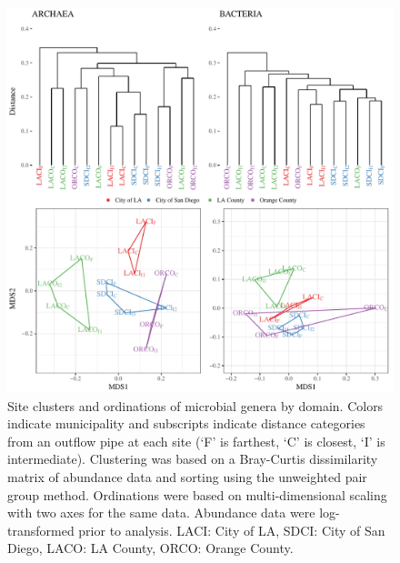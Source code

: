 \documentclass[letterpaper,12pt]{article}\usepackage[]{graphicx}\usepackage[]{color}
\newenvironment{knitrout}{}{} %
\begin{document}
\begin{knitrout}
\color{fgcolor}\begin{figure}[!ht]

{\centering \includegraphics[width=\textwidth]{figs/clust1_arch} 

}

\caption[Site clusters and ordinations of microbial genera by domain]{Site clusters and ordinations of microbial genera by domain.  Colors indicate municipality and subscripts indicate distance categories from an outflow pipe at each site (`F' is farthest, `C' is closest, `I' is intermediate).  Clustering was based on a Bray-Curtis dissimilarity matrix of abundance data and sorting using the unweighted pair group method.  Ordinations were based on multi-dimensional scaling with two axes for the same data.  Abundance data were log-transformed prior to analysis. LACI: City of LA, SDCI: City of San Diego, LACO: LA County, ORCO: Orange County.}\label{fig:clust1_arch}
\end{figure}


\end{knitrout}
\end{document}
